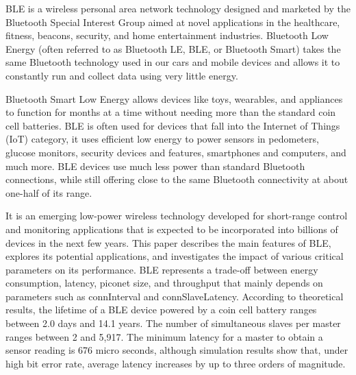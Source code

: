 \documentclass[11pt,a4paper]{article}
\begin{document}
	 { BLE is a wireless personal area network technology designed and marketed by the Bluetooth Special Interest Group aimed at novel applications in the healthcare, fitness, beacons, security, and home entertainment industries. Bluetooth Low Energy (often referred to as Bluetooth LE, BLE, or Bluetooth Smart) takes the same Bluetooth technology used in our cars and mobile devices and allows it to constantly run and collect data using very little energy. 
	 
 Bluetooth Smart Low Energy allows devices like toys, wearables, and appliances to function for months at a time without needing more than the standard coin cell batteries. BLE is often used for devices that fall into the Internet of Things (IoT) category, it uses efficient low energy to power sensors in pedometers, glucose monitors, security devices and features, smartphones and computers, and much more. BLE devices use much less power than standard Bluetooth connections, while still offering close to the same Bluetooth connectivity at about one-half of its range. 
 
 It is an emerging low-power wireless technology developed for short-range control and monitoring applications that is expected to be incorporated into billions of devices in the next few years. This paper describes the main features of BLE, explores its potential applications, and investigates the impact of various critical parameters on its performance. BLE represents a trade-off between energy consumption, latency, piconet size, and throughput that mainly depends on parameters such as connInterval and connSlaveLatency. 
 According to theoretical results, the lifetime of a BLE device powered by a coin cell battery ranges between 2.0 days and 14.1 years. The number of simultaneous slaves per master ranges between 2
 and 5,917. The minimum latency for a master
 to obtain a sensor reading is 676 micro seconds, although simulation results show that, under high bit error rate, average latency increases
 by up to three orders of magnitude.
 }
	 
	   \newpage
\end{document}
